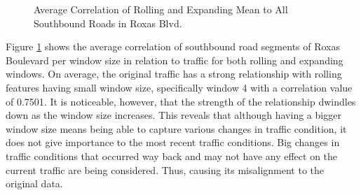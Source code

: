 \begin{figure}[t] 
\centering
  \centering
  \caption{Average Correlation of Rolling and Expanding Mean to All Southbound Roads in Roxas Blvd.}
  \label{heatmap_roxas}
\end{figure}

Figure \ref{heatmap_roxas} shows the average correlation of southbound road segments of Roxas Boulevard per window size in relation to traffic for both rolling and expanding windows. On average, the original traffic has a strong relationship with rolling features having small window size, specifically window 4 with a correlation value of 0.7501. It is noticeable, however, that the strength of the relationship dwindles down as the window size increases. This reveals that although having a bigger window size means being able to capture various changes in traffic condition, it does not give importance to the most recent traffic conditions. Big changes in traffic conditions that occurred way back and may not have any effect on the current traffic are being considered. Thus, causing its misalignment to the original data. 

